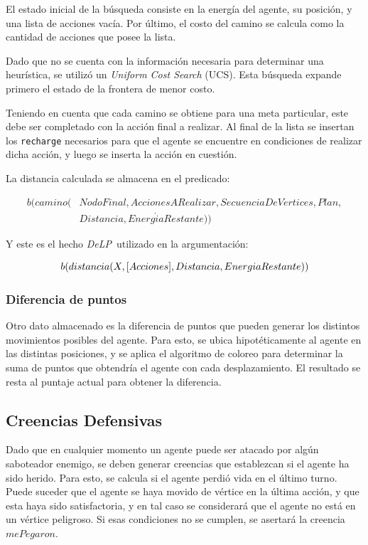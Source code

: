 \documentclass[oneside]{book}
\theoremstyle{definition}
\theoremstyle{example}
\newcommand{\DLP}{\mbox{\textit{DeLP}}}
\newcommand{\lit}[1]{\mbox{$ #1$}}
\newcommand{\nlA}[1]{$$\mbox{#1}$$}
\begin{document}
El estado inicial de la búsqueda consiste en la energía del agente, su posición, y una 
lista de acciones vacía. Por último, el costo del camino se calcula como la cantidad de 
acciones que posee la lista.

Dado que no se cuenta con la información necesaria para determinar una heurística, se 
utilizó un \textit{Uniform Cost Search} (UCS). Esta búsqueda expande primero el estado
de la frontera de menor costo.

Teniendo en cuenta que cada camino se obtiene para una meta particular, este debe ser
completado con la acción final a realizar. Al final de la lista se insertan los 
\texttt{recharge} necesarios para que el agente se encuentre en condiciones de realizar 
dicha acción, y luego se inserta la acción en cuestión.

La distancia calculada se almacena en el predicado:

\begin{equation*}
\begin{aligned}
b(camino(&NodoFinal, AccionesARealizar, SecuenciaDeV\acute{e}rtices, Plan,\\
   &Distancia, Energ\acute{i}aRestante))
\end{aligned}
\end{equation*}

Y este es el hecho \DLP\ utilizado en la argumentación:

\nlA{\lit{b(distancia(X, [Acciones], Distancia, EnergiaRestante))}}

\subsubsection{Diferencia de puntos}

Otro dato almacenado es la diferencia de puntos que pueden generar los distintos
movimientos posibles del agente. Para esto, se ubica hipotéticamente al agente
en las distintas posiciones, y se aplica el algoritmo de coloreo para determinar
la suma de puntos que obtendría el agente con cada desplazamiento. El resultado
se resta al puntaje actual para obtener la diferencia.

\subsection{Creencias Defensivas}

Dado que en cualquier momento un agente puede ser atacado por algún saboteador 
enemigo, se deben generar creencias que establezcan si el agente ha sido herido.
Para esto, se calcula si el agente perdió vida en el último turno. Puede suceder
que el agente se haya movido de vértice en la última acción, y que esta haya sido
satisfactoria, y en tal caso se considerará que el agente no está en un vértice
peligroso. Si esas condiciones no se cumplen, se asertará la creencia 
\lit{mePegaron}.
\end{document}
